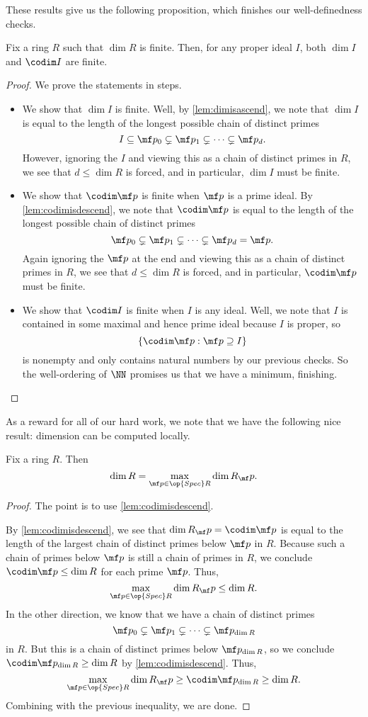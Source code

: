 These results give us the following proposition, which finishes our well-definedness checks.
\begin{prop}
	Fix a ring $R$ such that $\dim R$ is finite. Then, for any proper ideal $I$, both $\dim I$ and $\codim I$ are finite.
\end{prop}
\begin{proof}
	We prove the statements in steps.
	\begin{itemize}
		\item We show that $\dim I$ is finite. Well, by \autoref{lem:dimisascend}, we note that $\dim I$ is equal to the length of the longest possible chain of distinct primes
		\[I\subseteq\mf p_0\subsetneq\mf p_1\subsetneq\cdots\subsetneq\mf p_d.\]
		However, ignoring the $I$ and viewing this as a chain of distinct primes in $R$, we see that $d\le\dim R$ is forced, and in particular, $\dim I$ must be finite.
		\item We show that $\codim\mf p$ is finite when $\mf p$ is a prime ideal. By \autoref{lem:codimisdescend}, we note that $\codim\mf p$ is equal to the length of the longest possible chain of distinct primes
		\[\mf p_0\subsetneq\mf p_1\subsetneq\cdots\subsetneq\mf p_d=\mf p.\]
		Again ignoring the $\mf p$ at the end and viewing this as a chain of distinct primes in $R$, we see that $d\le\dim R$ is forced, and in particular, $\codim\mf p$ must be finite.
		\item We show that $\codim I$ is finite when $I$ is any ideal. Well, we note that $I$ is contained in some maximal and hence prime ideal because $I$ is proper, so
		\[\{\codim\mf p:\mf p\supseteq I\}\]
		is nonempty and only contains natural numbers by our previous checks. So the well-ordering of $\NN$ promises us that we have a minimum, finishing.
		\qedhere
	\end{itemize}
\end{proof}
As a reward for all of our hard work, we note that we have the following nice result: dimension can be computed locally.
\begin{theorem} \label{thm:dimislocal}
	Fix a ring $R$. Then
	\[\dim R=\max_{\mf p\in\op{Spec}R}\dim R_\mf p.\]
\end{theorem}
\begin{proof}
	The point is to use \autoref{lem:codimisdescend}.
	
	By \autoref{lem:codimisdescend}, we see that $\dim R_\mf p=\codim\mf p$ is equal to the length of the largest chain of distinct primes below $\mf p$ in $R$. Because such a chain of primes below $\mf p$ is still a chain of primes in $R$, we conclude $\codim\mf p\le\dim R$ for each prime $\mf p$. Thus,
	\[\max_{\mf p\in\op{Spec}R}\dim R_\mf p\le\dim R.\]
	In the other direction, we know that we have a chain of distinct primes
	\[\mf p_0\subsetneq\mf p_1\subsetneq\cdots\subsetneq\mf p_{\dim R}\]
	in $R$. But this is a chain of distinct primes below $\mf p_{\dim R}$, so we conclude $\codim\mf p_{\dim R}\ge\dim R$ by \autoref{lem:codimisdescend}. Thus,
	\[\max_{\mf p\in\op{Spec}R}\dim R_\mf p\ge\codim\mf p_{\dim R}\ge\dim R.\]
	Combining with the previous inequality, we are done.
\end{proof}

